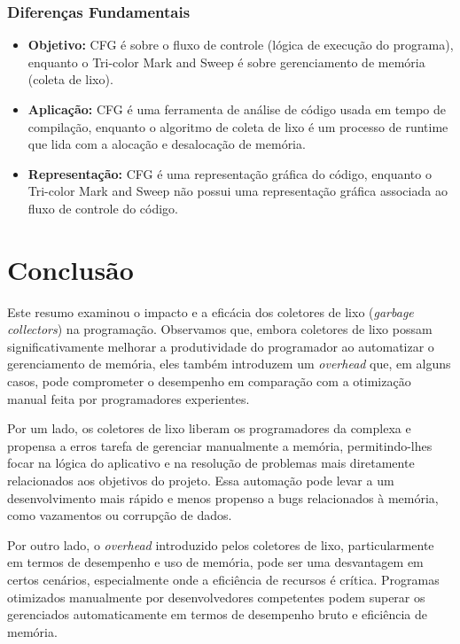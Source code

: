 \documentclass{article}
\begin{document}
    \subsubsection*{Diferenças Fundamentais}

    \begin{itemize}
        \item \textbf{Objetivo:} CFG é sobre o fluxo de controle (lógica de execução do programa), enquanto o
        Tri-color Mark and Sweep é sobre gerenciamento de memória (coleta de lixo).

        \item \textbf{Aplicação:} CFG é uma ferramenta de análise de código usada em tempo de compilação,
        enquanto o algoritmo de coleta de lixo é um processo de runtime que lida com a alocação e desalocação de memória.

        \item \textbf{Representação:} CFG é uma representação gráfica do código, enquanto o Tri-color Mark
        and Sweep não possui uma representação gráfica associada ao fluxo de controle do código.

    \end{itemize}

    \section*{Conclusão}

    Este resumo examinou o impacto e a eficácia dos coletores de lixo (\emph{garbage collectors}) na programação.
    Observamos que, embora coletores de lixo possam significativamente melhorar a produtividade do programador
    ao automatizar o gerenciamento de memória, eles também introduzem um \emph{overhead} que, em alguns casos, pode
    comprometer o desempenho em comparação com a otimização manual feita por programadores experientes.

    Por um lado, os coletores de lixo liberam os programadores da complexa e propensa a erros tarefa de
    gerenciar manualmente a memória, permitindo-lhes focar na lógica do aplicativo e na resolução de problemas
    mais diretamente relacionados aos objetivos do projeto. Essa automação pode levar a um desenvolvimento mais
    rápido e menos propenso a bugs relacionados à memória, como vazamentos ou corrupção de dados.

    Por outro lado, o \emph{overhead} introduzido pelos coletores de lixo, particularmente em termos de desempenho e uso
    de memória, pode ser uma desvantagem em certos cenários, especialmente onde a eficiência de recursos é crítica.
    Programas otimizados manualmente por desenvolvedores competentes podem superar os gerenciados automaticamente em
    termos de desempenho bruto e eficiência de memória.
\end{document}
